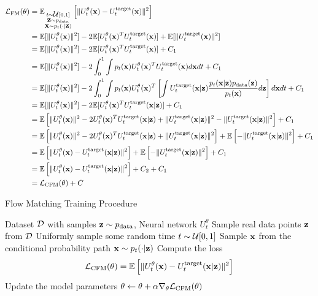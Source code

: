 \documentclass[a4paper, 11pt]{article}
\begin{document}
\begin{align}
    \fL_{\text{FM}}(\theta) &= \E_{\substack{t \sim \fU[0, 1] \\ 
    \vz \sim p_{\text{data}} \\
    \vx \sim p_t(\cdot | \vz)}} \left [ \|U_t^{\theta}(\vx) - U_t^{\text{target}}(\vx) \|^2 \right ] \\
    &= \E [ \|U_t^{\theta}(\vx) \|^2 ] - 2 \E [U_t^{\theta}(\vx)^T U_t^{\text{target}}(\vx)  ] + \E[\|U_t^{\text{target}}(\vx)\|^2] \\
    &= \E [ \|U_t^{\theta}(\vx) \|^2 ] - 2 \E [U_t^{\theta}(\vx)^T U_t^{\text{target}}(\vx)  ] + C_1 \\
    &= \E [ \|U_t^{\theta}(\vx) \|^2 ] - 2 \int_0^1 \int p_t(\vx) U_t^{\theta}(\vx)^T U_t^{\text{target}}(\vx) d\vx dt  + C_1 \\
    &= \E [ \|U_t^{\theta}(\vx) \|^2 ] - 2 \int_0^1 \int p_t(\vx) U_t^{\theta}(\vx)^T \left [ \int U_t^{\text{target}}(\vx | \vz) \frac{p_t( \vx|\vz)p_{\text{data}}(\vz)}{p_t(\vx)} d\vz \right ] d\vx dt  + C_1 \\
    &= \E [ \|U_t^{\theta}(\vx) \|^2 ] - 2 \E [U_t^{\theta}(\vx)^T U_t^{\text{target}}(\vx | \vz)  ]  + C_1 \\
    &= \E \left [ \|U_t^{\theta}(\vx) \|^2  - 2U_t^{\theta}(\vx)^T U_t^{\text{target}}(\vx | \vz)  + \|U_t^{\text{target}}(\vx | \vz)\|^2 - \|U_t^{\text{target}}(\vx | \vz)\|^2 \right ]  + C_1 \\
    &= \E \left [ \|U_t^{\theta}(\vx) \|^2  - 2U_t^{\theta}(\vx)^T U_t^{\text{target}}(\vx | \vz)  + \|U_t^{\text{target}}(\vx | \vz)\|^2 \right ] + \E \left  [- \|U_t^{\text{target}}(\vx | \vz)\|^2 \right ]  + C_1 \\
    &= \E \left [ \|U_t^{\theta}(\vx) - U_t^{\text{target}}(\vx | \vz) \|^2 \right ] + \E \left  [- \|U_t^{\text{target}}(\vx | \vz)\|^2 \right ]  + C_1 \\
    &= \E \left [ \|U_t^{\theta}(\vx) - U_t^{\text{target}}(\vx | \vz) \|^2 \right ] + C_2  + C_1 \\
    &= \fL_{\text{CFM}}(\theta) + C
\end{align}

\begin{algorithm}
    \caption{Flow Matching Training Procedure}\label{alg:fm_train}
    \begin{algorithmic}[1]
    \Require Dataset $\fD$ with samples $\vz \sim p_{\text{data}}$, Neural network $U_t^{\theta}$
    \State Sample real data points $\vz$ from $\fD$
    \State Uniformly sample some random time $t \sim \fU[0, 1]$
    \State Sample $\vx$ from the conditional probability path $\vx \sim p_t(\cdot | \vz)$
    \State Compute the loss
    \begin{align*}
        \fL_{\text{CFM}}(\theta) = \E \left [ \|U_t^{\theta}(\vx) - U_t^{\text{target}}(\vx | \vz) \|^2 \right ]
    \end{align*}
    \State Update the model parameters $\theta \gets \theta + \alpha \nabla_{\theta} \fL_{\text{CFM}}(\theta)$
    \EndWhile
    \end{algorithmic}
\end{algorithm}
    
\end{document}
